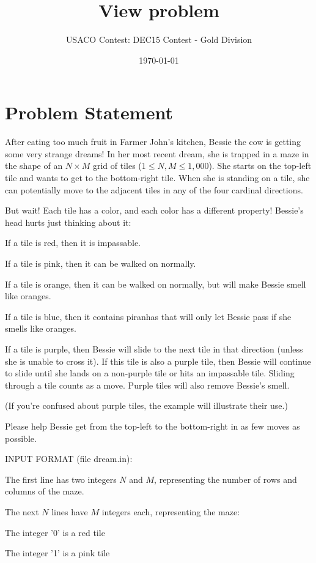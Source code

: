 \documentclass[12pt]{article}
\title{View problem}
\author{USACO Contest: DEC15 Contest - Gold Division}
\date{\today}
\begin{document}
\maketitle

\section*{Problem Statement}

After eating too much fruit in Farmer John's kitchen, Bessie the cow is getting some very
strange dreams!  In her most recent dream, she is trapped in a maze in the shape
of an $N \times M$ grid of tiles ($1 \le N, M \le 1,000$). She starts on the
top-left tile and wants to get to the bottom-right tile. When she is standing on
a tile, she can potentially move to the adjacent tiles in any of the four
cardinal directions.

But wait! Each tile has a color, and each color has a different property!
Bessie's head hurts just thinking about it:


If a tile is red, then it is impassable.

If a tile is pink, then it can be walked on normally.

If a tile is orange, then it can be walked on normally, but will make
Bessie smell like oranges.

If a tile is blue, then it contains piranhas that will only let Bessie
pass if she smells like oranges.

If a tile is purple, then Bessie will slide to the next tile in that
direction (unless she is unable to cross it). If this tile is also a purple
tile, then Bessie will continue to slide until she lands on a non-purple tile or
hits an impassable tile. Sliding through a tile counts as a move. Purple
tiles will also remove Bessie's smell.

(If you're confused about purple tiles, the example will illustrate their use.)

Please help Bessie get from the top-left to the bottom-right in as few moves as
possible.

INPUT FORMAT (file dream.in):

The first line has two integers $N$ and $M$, representing the number of rows and
columns of the maze.

The next $N$ lines have $M$ integers each, representing the maze:


The integer '0' is a red tile

The integer '1' is a pink tile
\end{document}
